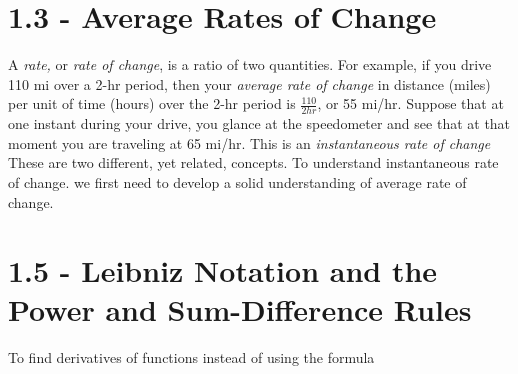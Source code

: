 \documentclass{report}
\begin{document}
\section*{1.3 - Average Rates of Change}
\begin{mdframed}
  \vspace{2mm}

  A \textit{rate,} or \textit{rate of change}, is a ratio of two quantities. For example, if you drive 110 mi over a 2-hr period, then your \textit{average rate of change} in distance (miles) per unit of time (hours) over the 2-hr period is $\frac{110}{2 hr}$, or 55 mi/hr. Suppose that at one instant during your drive, you glance at the speedometer and see that at that moment you are traveling at 65 mi/hr. This is an \textit{instantaneous rate of change} These are two different, yet related, concepts. To understand instantaneous rate of change. we first need to develop a solid understanding of average rate of change.
  \vspace{2mm} 

\end{mdframed}
\bigbreak \noindent \bigbreak \noindent
{}
\bigbreak \noindent
{}
\pagebreak
\section*{1.5 - Leibniz Notation and the Power and Sum-Difference Rules}
To find derivatives of functions instead of using the formula
\end{document}
